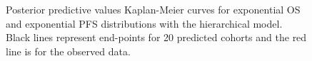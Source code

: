\documentclass[AMA,STIX1COL]{WileyNJD-v2}
\begin{document}
\begin{figure}[H]
    \centering
    \qquad
    \caption{Posterior predictive values Kaplan-Meier curves for exponential OS and exponential PFS distributions with the hierarchical model. Black lines represent end-points for 20 predicted cohorts and the red line is for the observed data.}%


\end{figure}
\end{document}
